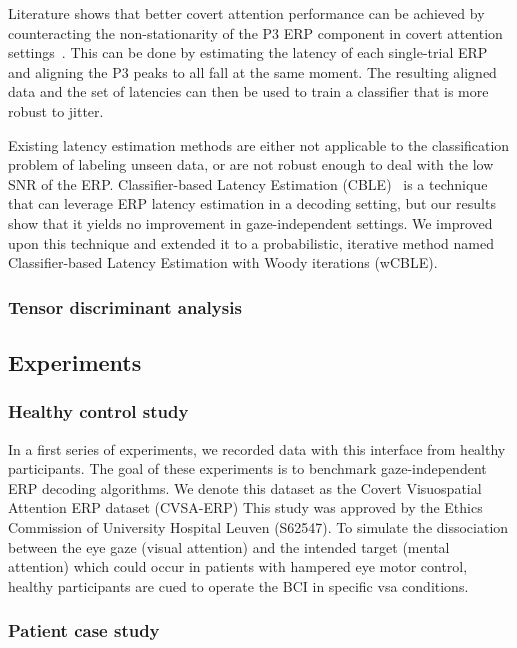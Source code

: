 
Literature shows that better covert attention performance can be achieved by
counteracting the non-stationarity of the P3 ERP component in covert
attention settings~\cite{Arico2014}.
This can be done by estimating the latency of each single-trial ERP and aligning
the P3 peaks to all fall at the same moment.
The resulting aligned data and the set of latencies can then be used to train a
classifier that is more robust to jitter.

Existing latency estimation methods are either not applicable to the
classification problem of labeling unseen data, or are not robust enough to
deal with the low SNR of the ERP.
Classifier-based Latency Estimation (CBLE)~\cite{Mowla2017} is a technique that can leverage
ERP latency estimation in a decoding setting, but our results show that it
yields no improvement in gaze-independent settings.
We improved upon this technique and extended it to a probabilistic, iterative
method named Classifier-based Latency Estimation with Woody iterations (wCBLE).

\subsubsection{Tensor discriminant analysis}

\subsection{Experiments}

\subsubsection{Healthy control study}
In a first series of experiments, we recorded data with this interface from healthy participants.
The goal of these experiments is to benchmark
gaze-independent ERP decoding algorithms.
We denote this dataset as the Covert Visuospatial Attention ERP dataset
(CVSA-ERP)
This study was approved by the Ethics Commission of University Hospital Leuven
(S62547).
To simulate the dissociation between the eye gaze (visual attention) and the
intended target (mental attention) which could occur in patients with hampered eye
motor control, healthy participants are cued to operate the BCI in specific
\ac{vsa} conditions.


\subsubsection{Patient case study}

